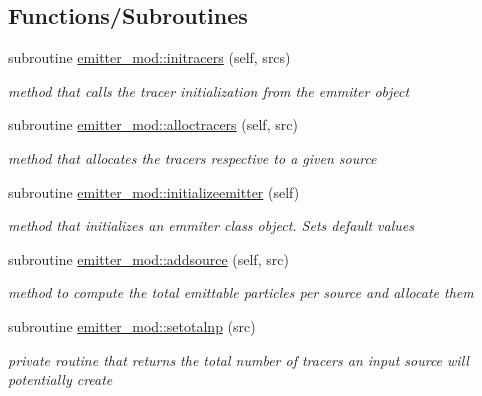 \subsection*{Functions/\+Subroutines}
\begin{DoxyCompactItemize}
\item 
subroutine \hyperlink{namespaceemitter__mod_ad89dfc083eae7362441c353225a74ebc}{emitter\+\_\+mod\+::initracers} (self, srcs)
\begin{DoxyCompactList}\small\item\em method that calls the tracer initialization from the emmiter object \end{DoxyCompactList}\item 
subroutine \hyperlink{namespaceemitter__mod_a7c677125988390e4c57909e4ea82d902}{emitter\+\_\+mod\+::alloctracers} (self, src)
\begin{DoxyCompactList}\small\item\em method that allocates the tracers respective to a given source \end{DoxyCompactList}\item 
subroutine \hyperlink{namespaceemitter__mod_a6376ad0f8e1739b29caf672aa0750373}{emitter\+\_\+mod\+::initializeemitter} (self)
\begin{DoxyCompactList}\small\item\em method that initializes an emmiter class object. Sets default values \end{DoxyCompactList}\item 
subroutine \hyperlink{namespaceemitter__mod_ab704fb0e2eb9b3b4b9542706b6fb4eaf}{emitter\+\_\+mod\+::addsource} (self, src)
\begin{DoxyCompactList}\small\item\em method to compute the total emittable particles per source and allocate them \end{DoxyCompactList}\item 
subroutine \hyperlink{namespaceemitter__mod_a5c219dd6692a761ad4bf968ae750fcc6}{emitter\+\_\+mod\+::setotalnp} (src)
\begin{DoxyCompactList}\small\item\em private routine that returns the total number of tracers an input source will potentially create \end{DoxyCompactList}\end{DoxyCompactItemize}
